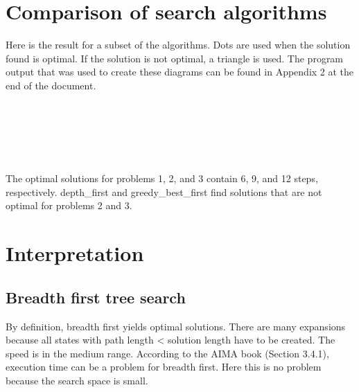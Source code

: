 \documentclass[11pt]{scrartcl}
\begin{document}
    
\section*{Comparison of search algorithms}\label{comparison-of-search-algorithms}

Here is the result for a subset of the algorithms. Dots are used when
the solution found is optimal. If the solution is not optimal, a
triangle is used. The program output that was used to create these
diagrams can be found in Appendix 2 at the end of the document.

    \begin{center}
    \end{center}
    { \hspace*{\fill} \\}
    
    \begin{center}
    \end{center}
    { \hspace*{\fill} \\}
    
    \begin{center}
    \end{center}
    { \hspace*{\fill} \\}
    
    The optimal solutions for problems 1, 2, and 3 contain 6, 9, and 12
steps, respectively. depth\_first and greedy\_best\_first find solutions
that are not optimal for problems 2 and 3.

\section*{Interpretation}\label{interpretation}

\subsection*{Breadth first tree search}\label{breadth-first-tree-search}
By definition, breadth first yields optimal solutions. There are many expansions because all states with path length < solution length have to be created. The speed is in the medium range. According to the AIMA book (Section 3.4.1), execution time can be a problem for breadth first. Here this is no problem because the search space is small.
\end{document}

